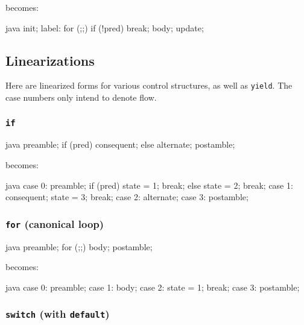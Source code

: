 \documentclass[journal,a4paper]{IEEEtran}
\begin{document}
becomes:

\begin{pygmented}{java}
{
    init;
    label: for (;;) {
        if (!pred) break; body;
        update;
    }
}
\end{pygmented}

\subsection{Linearizations} \label{appendix:linearizations}

Here are linearized forms for various control structures, as well as \texttt{yield}. The case
numbers only intend to denote flow.

\subsubsection{\texttt{if}}

\begin{pygmented}{java}
preamble;
if (pred) {
    consequent;
} else {
    alternate;
}
postamble;
\end{pygmented}

becomes:

\begin{pygmented}{java}
case 0:
    preamble;
    if (pred) {
        state = 1;
        break;
    } else {
        state = 2;
        break;
    }
case 1:
    consequent;
    state = 3;
    break;
case 2:
    alternate;
case 3:
    postamble;
\end{pygmented}

\subsubsection{\texttt{for} (canonical loop)}

\begin{pygmented}{java}
preamble;
for (;;) {
    body;
}
postamble;
\end{pygmented}

becomes:

\begin{pygmented}{java}
case 0:
    preamble;
case 1:
    body;
case 2:
    state = 1;
    break;
case 3:
    postamble;
\end{pygmented}

\subsubsection{\texttt{switch} (with \texttt{default})}
\end{document}
